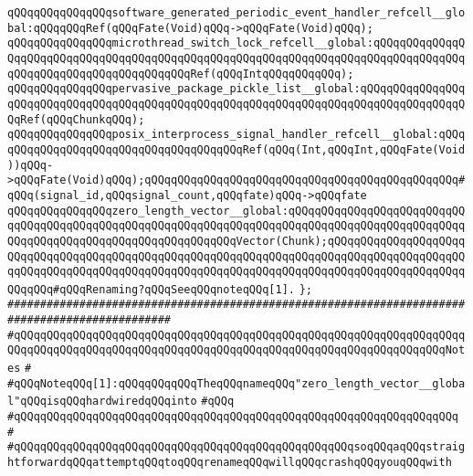 \verb|qQQqqQQqqQQqqQQqsoftware_generated_periodic_event_handler_refcell__global:qQQqqQQqRef(qQQqFate(Void)qQQq->qQQqFate(Void)qQQq);|\newline
\verb|qQQqqQQqqQQqqQQqmicrothread_switch_lock_refcell__global:qQQqqQQqqQQqqQQqqQQqqQQqqQQqqQQqqQQqqQQqqQQqqQQqqQQqqQQqqQQqqQQqqQQqqQQqqQQqqQQqqQQqqQQqqQQqqQQqqQQqqQQqqQQqqQQqRef(qQQqIntqQQqqQQqqQQq);|\newline
\verb|qQQqqQQqqQQqqQQqpervasive_package_pickle_list__global:qQQqqQQqqQQqqQQqqQQqqQQqqQQqqQQqqQQqqQQqqQQqqQQqqQQqqQQqqQQqqQQqqQQqqQQqqQQqqQQqqQQqqQQqRef(qQQqChunkqQQq);|\newline
\verb|qQQqqQQqqQQqqQQqposix_interprocess_signal_handler_refcell__global:qQQqqQQqqQQqqQQqqQQqqQQqqQQqqQQqqQQqqQQqRef(qQQq(Int,qQQqInt,qQQqFate(Void))qQQq->qQQqFate(Void)qQQq);qQQqqQQqqQQqqQQqqQQqqQQqqQQqqQQqqQQqqQQqqQQqqQQq#qQQq(signal_id,qQQqsignal_count,qQQqfate)qQQq->qQQqfate|\newline
\verb|qQQqqQQqqQQqqQQqzero_length_vector__global:qQQqqQQqqQQqqQQqqQQqqQQqqQQqqQQqqQQqqQQqqQQqqQQqqQQqqQQqqQQqqQQqqQQqqQQqqQQqqQQqqQQqqQQqqQQqqQQqqQQqqQQqqQQqqQQqqQQqqQQqqQQqqQQqqQQqVector(Chunk);qQQqqQQqqQQqqQQqqQQqqQQqqQQqqQQqqQQqqQQqqQQqqQQqqQQqqQQqqQQqqQQqqQQqqQQqqQQqqQQqqQQqqQQqqQQqqQQqqQQqqQQqqQQqqQQqqQQqqQQqqQQqqQQqqQQqqQQqqQQqqQQqqQQqqQQqqQQqqQQqqQQqqQQq#qQQqRenaming?qQQqSeeqQQqnoteqQQq[1].|\newline
\verb|};|\newline
\newline
\verb|###############################################################################################|\newline
\verb|#qQQqqQQqqQQqqQQqqQQqqQQqqQQqqQQqqQQqqQQqqQQqqQQqqQQqqQQqqQQqqQQqqQQqqQQqqQQqqQQqqQQqqQQqqQQqqQQqqQQqqQQqqQQqqQQqqQQqqQQqqQQqqQQqqQQqqQQqNotes|\newline
\verb|#|\newline
\verb|#qQQqNoteqQQq[1]:qQQqqQQqqQQqTheqQQqnameqQQq"zero_length_vector__global"qQQqisqQQqhardwiredqQQqinto|\newline
\verb|#qQQq|\newline
\verb|#qQQqqQQqqQQqqQQqqQQqqQQqqQQqqQQqqQQqqQQqqQQqqQQqqQQqqQQqqQQqqQQqqQQq|\newline
\verb|#|\newline
\verb|#qQQqqQQqqQQqqQQqqQQqqQQqqQQqqQQqqQQqqQQqqQQqqQQqqQQqsoqQQqaqQQqstraightforwardqQQqattemptqQQqtoqQQqrenameqQQqwillqQQqcrashqQQqyouqQQqwith|\newline
